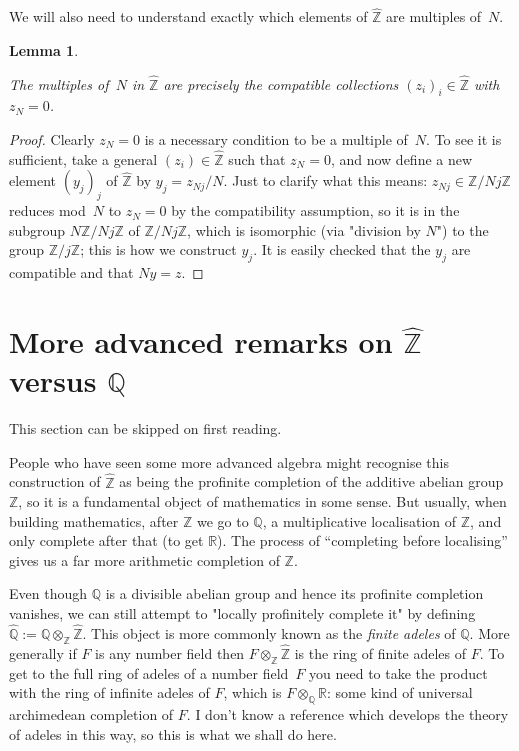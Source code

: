 \documentclass[10pt,a4paper]{article}
\newcommand{\Z}{\mathbb{Z}}
\newcommand{\Q}{\mathbb{Q}}
\newcommand{\R}{\mathbb{R}}
\newcommand{\Qhat}{\widehat{\Q}}
\newcommand{\Zhat}{\widehat{\Z}}
\newtheorem{lemma}[theorem]{Lemma}
\newcommand{\uses}[1]{}
\newcommand{\lean}[1]{}
\newcommand{\leanok}{}
\begin{document}
We will also need to understand exactly which elements of $\Zhat$
are multiples of~$N$.

\begin{lemma}
    \label{ZHat.multiples}
    \lean{ZHat.multiples}
    \uses{ZHat.commRing}
    \leanok
    The multiples of~$N$ in $\Zhat$ are precisely the compatible collections $(z_i)_i\in\Zhat$
    with $z_N=0$.
\end{lemma}
\begin{proof} \leanok
    Clearly $z_N=0$ is a necessary condition to be a multiple of~$N$. To see it is sufficient,
    take a general $(z_i)\in\Zhat$ such that $z_N=0$,
    and now define a new element $(y_j)_j$ of $\Zhat$
    by $y_j=z_{Nj}/N$. Just to clarify what this means: $z_{Nj}\in\Z/Nj\Z$ reduces mod~$N$
    to $z_N=0$ by the compatibility assumption, so it is in the subgroup $N\Z/Nj\Z$ of $\Z/Nj\Z$,
    which is isomorphic (via "division by $N$") to the group $\Z/j\Z$; this is how we construct
    $y_j$. It is easily checked that the $y_j$ are compatible and that $Ny=z$.
\end{proof}

\section{More advanced remarks on \texorpdfstring{$\Zhat$}{Zhat} versus \texorpdfstring{$\Q$}{Q}}

This section can be skipped on first reading.

People who have seen some more advanced algebra might recognise this construction of $\Zhat$
as being the profinite completion of the additive abelian group $\Z$, so it is a fundamental
object of mathematics in some sense. But usually, when building mathematics, after $\Z$ we
go to $\Q$, a multiplicative localisation of $\Z$, and only complete after that (to get $\R$).
The process of ``completing before localising'' gives us a far more arithmetic completion
of $\Z$.

Even though $\Q$ is a divisible abelian group and hence its profinite completion vanishes,
we can still attempt to "locally profinitely complete it" by defining $\Qhat:=\Q\otimes_{\Z}\Zhat$.
This object is more commonly known as the \emph{finite adeles} of $\Q$. More generally if $F$ is
any number field then $F\otimes_{\Z}\Zhat$ is the ring of finite adeles of $F$. To get to
the full ring of adeles of a number field~$F$ you need to take the product with the
ring of infinite adeles of $F$, which is $F\otimes_{\Q}\R$: some kind of universal
archimedean completion of $F$. I don't know a reference which develops the theory of adeles
in this way, so this is what we shall do here.
\end{document}
